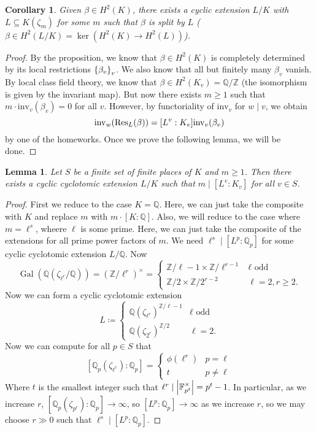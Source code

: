 \documentclass[leqno, openany]{memoir}
\newtheorem{cor}[thm]{Corollary}
\newtheorem{lem}[thm]{Lemma}
\theoremstyle{definition}
\theoremstyle{remark}
\theoremstyle{plain}
\theoremstyle{definition}
\theoremstyle{remark}
\newcommand{\F}{\mathbb{F}}
\newcommand{\Z}{\mathbb{Z}}
\newcommand{\Q}{\mathbb{Q}}
\newcommand{\mr}[1]{\mathrm{#1}}
\DeclareMathOperator{\Gal}{Gal}
\begin{document}
\begin{cor} Given $\beta \in H^2(K)$, there exists a cyclic extension $L/K$
with $L \subseteq K(\zeta_m)$ for some $m$ such that $\beta$ is split by $L$
($\beta \in H^2(L/K) = \ker(H^2(K) \to H^2(L))$).  \end{cor}

\begin{proof} By the proposition, we know that $\beta \in H^2(K)$ is completely
    determined by its local restrictions $\qty{\beta_v}_v$. We also know that
    all but finitely many $\beta_v$ vanish. By local class field theory, we
    know that $\beta \in H^2(K_v) = \Q/\Z$ (the isomorphism is given by the
    invariant map). But now there exists $m \geq 1$ such that $m \cdot
    \mr{inv}_v(\beta_v) = 0$ for all $v$. However, by functoriality of
    $\mr{inv}_v$ for $w \mid v$, we obtain \[ \mr{inv}_w (\Res_L(\beta)) =
    [L^v:K_v] \mr{inv}_v(\beta_v) \] by one of the homeworks. Once we prove the
following lemma, we will be done.  \end{proof}

\begin{lem} Let $S$ be a finite set of finite places of $K$ and $m \geq 1$.
Then there exists a cyclic cyclotomic extension $L/K$ such that $m \mid
[L^v:K_v]$ for all $v \in S$.  \end{lem}

\begin{proof} First we reduce to the case $K = \Q$. Here, we can just take the
    composite with $K$ and replace $m$ with $m \cdot [K:\Q]$. Also, we will
    reduce to the case where $m = \ell^s$, wheere $\ell$ is some prime. Here,
    we can just take the composite of the extensions for all prime power
    factors of $m$. We need $\ell^s \mid [L^p : \Q_p]$ for some cyclic
    cyclotomic extension $L/\Q$. Now \[ \Gal(\Q(\zeta_{\ell^r}/\Q)) =
        {(\Z/\ell^r)}^{\times} = \begin{cases} \Z/\ell-1 \times \Z/\ell^{r-1} &
        \ell \text{ odd } \\ \Z/2 \times \Z/2^{r-2} & \ell = 2, r \geq 2.
    \end{cases} \] Now we can form a cyclic cyclotomic extension \[ L \coloneqq
        \begin{cases} {\Q(\zeta_{\ell^r})}^{\Z/\ell-1} & \ell \text{ odd } \\
        {\Q(\zeta_{2^r})}^{\Z/2} & \ell = 2.  \end{cases} \] Now we can compute
        for all $p \in S$ that \[ [\Q_p(\zeta_{\ell^r}) : \Q_p] = \begin{cases}
        \phi(\ell^r) & p=\ell \\ t & p \neq \ell \end{cases} \] Where $t$ is
        the smallest integer such that $\ell^r \mid \abs{\F_{p^t}^{\times}} =
        p^t-1$. In particular, as we increase $r$, $[\Q_p(\zeta_{p^r}):\Q_p]
        \to \infty$, so $[L^p \colon \Q_p] \to \infty$ as we increase $r$, so
        we may choose $r \gg 0$ such that $\ell^s \mid [L^p:\Q_p]$.
        \end{proof}
\end{document}
